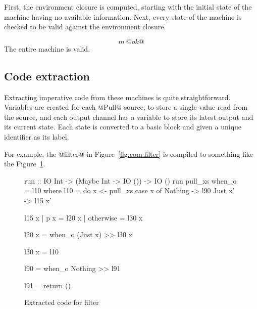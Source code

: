 First, the environment closure is computed, starting with the initial state of the machine having no available information.
Next, every state of the machine is checked to be valid against the environment closure.

$$ m~@ok@ $$
The entire machine is valid.


\subsection{Code extraction}

Extracting imperative code from these machines is quite straightforward.
Variables are created for each @Pull@ source, to store a single value read from the source, and each output channel has a variable to store its latest output and its current state.
Each state is converted to a basic block and given a unique identifier as its label.

For example, the @filter@ in Figure~\ref{fig:com:filter} is compiled to something like the Figure~\ref{fig:extract:filter}.

\begin{figure}
\begin{code}
run :: IO Int -> (Maybe Int -> IO ()) -> IO ()
run pull_xs when_o = l10
 where
  l10 = do  x  <- pull_xs
            case x of
             Nothing -> l90
             Just x' -> l15 x'

  l15 x | p x       = l20 x
        | otherwise = l30 x

  l20 x =   when_o (Just x)  >> l30 x

  l30 x =   l10

  l90   =   when_o Nothing  >> l91

  l91   =   return ()
\end{code}
\caption{Extracted code for filter}
\label{fig:extract:filter}
\end{figure}


